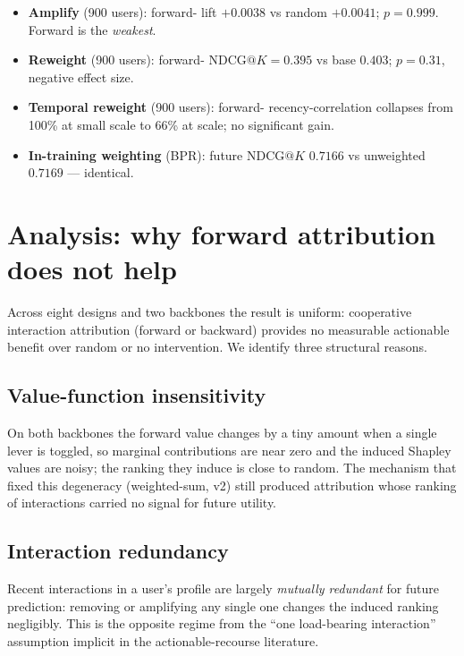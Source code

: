 \documentclass[pdflatex,sn-mathphys-num]{sn-jnl}%
\makeatletter
\theoremstyle{thmstyleone}%
\theoremstyle{thmstyletwo}%
\theoremstyle{thmstylethree}%
\newcommand{\CAV}{\mathrm{CAV}}
\newcommand{\NDCG}{\mathrm{NDCG@}K}
\makeatother
\begin{document}
\begin{itemize}
\item \textbf{Amplify} (900 users): forward-\CAV{} lift $+0.0038$ vs random $+0.0041$; $p=0.999$. Forward is the \emph{weakest}.
\item \textbf{Reweight} (900 users): forward-\CAV{} $\NDCG{}=0.395$ vs base $0.403$; $p=0.31$, negative effect size.
\item \textbf{Temporal reweight} (900 users): forward-\CAV{} recency-correlation collapses from 100\% at small scale to 66\% at scale; no significant gain.
\item \textbf{In-training weighting} (BPR): future $\NDCG{}$ $0.7166$ vs unweighted $0.7169$ --- identical.
\end{itemize}

\section{Analysis: why forward attribution does not help}\label{sec5}

Across eight designs and two backbones the result is uniform: cooperative interaction attribution (forward or backward) provides no measurable actionable benefit over random or no intervention. We identify three structural reasons.

\subsection{Value-function insensitivity}
On both backbones the forward value changes by a tiny amount when a single lever is toggled, so marginal contributions are near zero and the induced Shapley values are noisy; the ranking they induce is close to random. The mechanism that fixed this degeneracy (weighted-sum, v2) still produced attribution whose ranking of interactions carried no signal for future utility.

\subsection{Interaction redundancy}
Recent interactions in a user's profile are largely \emph{mutually redundant} for future prediction: removing or amplifying any single one changes the induced ranking negligibly. This is the opposite regime from the ``one load-bearing interaction'' assumption implicit in the actionable-recourse literature.
\end{document}
